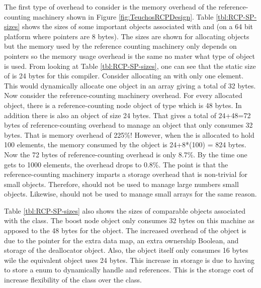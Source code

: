 \documentclass[pdf,ps2pdf,11pt]{SANDreport}
\begin{document}
The first type of overhead to consider is the memory overhead of the
reference-counting machinery shown in Figure
{}\ref{fig:TeuchosRCPDesign}.  Table {}\ref{tbl:RCP-SP-sizes} shows
the sizes of some important objects associated with {} and
{} (on a 64 bit platform where pointers are 8
bytes).  The sizes are shown for allocating
{} objects but the memory used by the
reference counting machinery only depends on pointers so the memory
usage overhead is the same no mater what type of object is used.  From
looking at Table {}\ref{tbl:RCP-SP-sizes}, one can see that the static
size of {} is 24 bytes for this compiler.
Consider allocating an {} with only one
element.  This would dynamically allocate one {} object in
an array giving a total of 32 bytes.  Now consider the
reference-counting machinery overhead.  For every allocated
{} object, there is a reference-counting node
object of type {} which is
48 bytes.  In addition there is also an {} object of size 24 bytes.  That gives a total of 24+48=72 bytes of
reference-counting overhead to manage an object that only consumes 32
bytes.  That is memory overhead of 225\%!  However, when the
{} is allocated to hold 100 elements, the
memory consumed by the {} object is
24+8*(100) = 824 bytes.  Now the 72 bytes of reference-counting
overhead is only 8.7\%.  By the time one gets to 1000 elements, the
overhead drops to 0.8\%.  The point is that the reference-counting
machinery imparts a storage overhead that is non-trivial for small
objects.  Therefore, {} should not be used to manage large
numbers small objects.  Likewise, {} should not be used
to manage small arrays for the same reason.

Table {}\ref{tbl:RCP-SP-sizes} also shows the sizes of comparable
objects associated with the {} class.  The
boost node object only consumes 32 bytes on this machine as apposed to
the 48 bytes for the {} object.  The increased
overhead of the {} object is due to the pointer
for the extra data map, an extra ownership Boolean, and storage of the
deallocator object.  Also, the {} object
itself only consumes 16 bytes wile the equivalent {}
object uses 24 bytes.  This increase in storage is due to having to
store a {} enum to dynamically handle
{} and {} references.  This is the storage
cost of increase flexibility of the {} class over the
{} class.
\end{document}
